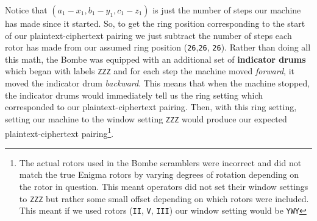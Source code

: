 Notice that $(a_1-x_1, b_1-y_1, c_1-z_1)$ is just the number of steps
our machine has made since it started. So, to get the ring position
corresponding to the start of our plaintext-ciphertext pairing we
just subtract the number of steps each rotor has made from our
assumed ring position (\texttt{26},\texttt{26}, \texttt{26}). Rather
than doing all this math, the Bombe was equipped with an additional
set of {\bf{indicator drums}} which began with labels \texttt{ZZZ}
and for each step the machine moved \emph{forward}, it moved the
indicator drum \emph{backward}. This means that when the machine
stopped, the indicator drums would immediately tell us the ring
setting which corresponded to our plaintext-ciphertext pairing. Then,
with this ring setting, setting our machine to the window setting
\texttt{ZZZ} would produce our expected plaintext-ciphertext
pairing\footnote{The actual rotors used in the Bombe scramblers were
  incorrect and did not match the true Enigma rotors by varying degrees
  of rotation depending on the rotor in question. This meant operators
  did not set their window settings to \texttt{ZZZ} but rather some
  small offset depending on which rotors were included. This meant if
  we used rotors (\texttt{II}, \texttt{V}, \texttt{III}) our window
setting would be \texttt{YWY}}.

